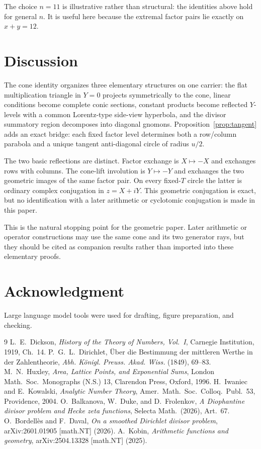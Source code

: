 \documentclass[11pt]{amsart}
\theoremstyle{remark}
\numberwithin{equation}{section}
\begin{document}
The choice $n=11$ is illustrative rather than structural: the identities above hold for general $n$. It is useful here because the extremal factor pairs lie exactly on $x+y=12$.

\section{Discussion}
The cone identity organizes three elementary structures on one carrier: the flat multiplication triangle in $Y=0$ projects symmetrically to the cone, linear conditions become complete conic sections, constant products become reflected $Y$-levels with a common Lorentz-type side-view hyperbola, and the divisor summatory region decomposes into diagonal gnomons. Proposition~\ref{prop:tangent} adds an exact bridge: each fixed factor level determines both a row/column parabola and a unique tangent anti-diagonal circle of radius $u/2$.

The two basic reflections are distinct. Factor exchange is $X\mapsto-X$ and exchanges rows with columns. The cone-lift involution is $Y\mapsto-Y$ and exchanges the two geometric images of the same factor pair. On every fixed-$T$ circle the latter is ordinary complex conjugation in $z=X+iY$. This geometric conjugation is exact, but no identification with a later arithmetic or cyclotomic conjugation is made in this paper.

This is the natural stopping point for the geometric paper. Later arithmetic or operator constructions may use the same cone and its two generator rays, but they should be cited as companion results rather than imported into these elementary proofs.

\section*{Acknowledgment}
Large language model tools were used for drafting, figure preparation, and checking.

\begin{thebibliography}{9}
 L.~E.~Dickson, \emph{History of the Theory of Numbers, Vol.~I}, Carnegie Institution, 1919, Ch.~14.
 P.~G.~L.~Dirichlet, \"Uber die Bestimmung der mittleren Werthe in der Zahlentheorie, \emph{Abh. K\"onigl. Preuss. Akad. Wiss.} (1849), 69--83.
 M.~N.~Huxley, \emph{Area, Lattice Points, and Exponential Sums}, London Math.\ Soc.\ Monographs (N.S.) 13, Clarendon Press, Oxford, 1996.
 H.~Iwaniec and E.~Kowalski, \emph{Analytic Number Theory}, Amer.\ Math.\ Soc.\ Colloq.\ Publ.\ 53, Providence, 2004.
 O.~Balkanova, W.~Duke, and D.~Frolenkov, \emph{A Diophantine divisor problem and Hecke zeta functions}, Selecta Math.\ (2026), Art.~67.
 O.~Bordell\`es and F.~Daval, \emph{On a smoothed Dirichlet divisor problem}, arXiv:2601.01905 [math.NT] (2026).
 A.~Kobin, \emph{Arithmetic functions and geometry}, arXiv:2504.13328 [math.NT] (2025).
\end{thebibliography}
\end{document}
